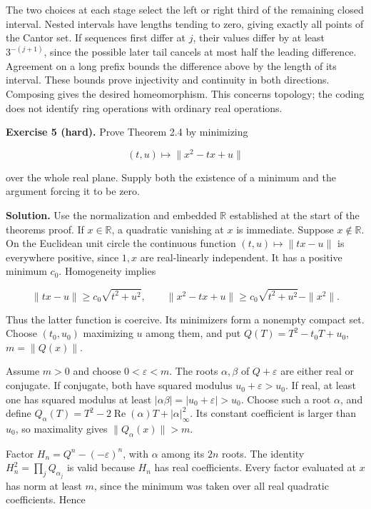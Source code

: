 \documentclass[
  english,
  11pt,
  a4paper,
]{article}
\newcounter{none} %
\begin{document}
The two choices at each stage select the left or right third of the
remaining closed interval. Nested intervals have lengths tending to
zero, giving exactly all points of the Cantor set. If sequences first
differ at \(j\), their values differ by at least \(3^{-(j+1)}\), since
the possible later tail cancels at most half the leading difference.
Agreement on a long prefix bounds the difference above by the length of
its interval. These bounds prove injectivity and continuity in both
directions. Composing gives the desired homeomorphism. This concerns
topology; the coding does not identify ring operations with ordinary
real operations.

\textbf{Exercise 5 (hard).} Prove Theorem 2.4 by minimizing

\[(t,u)\longmapsto\|x^2-tx+u\|\]

over the whole real plane. Supply both the existence of a minimum and
the argument forcing it to be zero.

\textbf{Solution.} Use the normalization and embedded \(\mathbb R\)
established at the start of the theorem\textquotesingle s proof. If
\(x\in\mathbb R\), a quadratic vanishing at \(x\) is immediate. Suppose
\(x\notin\mathbb R\). On the Euclidean unit circle the continuous
function \((t,u)\mapsto\|tx-u\|\) is everywhere positive, since \(1,x\)
are real-linearly independent. It has a positive minimum \(c_0\).
Homogeneity implies

\[\|tx-u\|\ge c_0\sqrt{t^2+u^2},
\qquad
\|x^2-tx+u\|\ge c_0\sqrt{t^2+u^2}-\|x^2\|.\]

Thus the latter function is coercive. Its minimizers form a nonempty
compact set. Choose \((t_0,u_0)\) maximizing \(u\) among them, and put
\(Q(T)=T^2-t_0T+u_0\), \(m=\|Q(x)\|\).

Assume \(m>0\) and choose \(0<\varepsilon<m\). The roots
\(\alpha,\beta\) of \(Q+\varepsilon\) are either real or conjugate. If
conjugate, both have squared modulus \(u_0+\varepsilon>u_0\). If real,
at least one has squared modulus at least
\(|\alpha\beta|=|u_0+\varepsilon|>u_0\). Choose such a root \(\alpha\),
and define
\(Q_\alpha(T)=T^2-2\operatorname{Re}(\alpha)T+|\alpha|_\infty^2\). Its
constant coefficient is larger than \(u_0\), so maximality gives
\(\|Q_\alpha(x)\|>m\).

Factor \(H_n=Q^n-(-\varepsilon)^n\), with \(\alpha\) among its \(2n\)
roots. The identity \(H_n^2=\prod_jQ_{\alpha_j}\) is valid because
\(H_n\) has real coefficients. Every factor evaluated at \(x\) has norm
at least \(m\), since the minimum was taken over all real quadratic
coefficients. Hence
\end{document}
